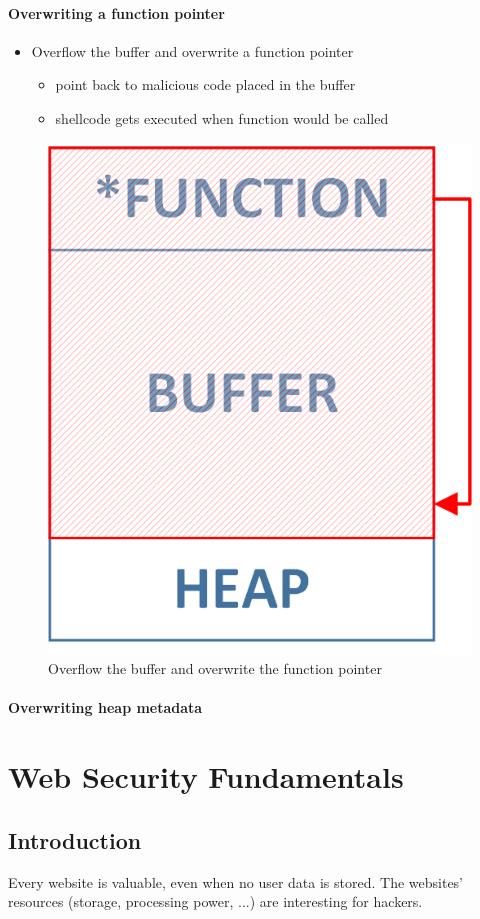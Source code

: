 \documentclass[12pt,titlepage,a4paper]{report}
\begin{document}
	\subsubsection{Overwriting a function pointer}
	\begin{itemize}
		\item Overflow the buffer and overwrite a function pointer
		\begin{itemize}
			\item point back to malicious code placed in the buffer
			\item shellcode gets executed when function would be called
		\end{itemize}
	\end{itemize}

	\begin{figure}[h]
		\centering
		\includegraphics*[scale=0.75]{assets/img/HeapBufferOverflowFunctionPointer.png}
		\caption{\label{img:heapBufferOverflowFuncionPointer}Overflow the buffer and overwrite the function pointer}
	\end{figure}
	
	\subsubsection{Overwriting heap metadata}
	
	
	\chapter{Web Security Fundamentals}
	\section{Introduction}
	Every website is valuable, even when no user data is stored. The websites' resources (storage, processing power, ...) are interesting for hackers.
\end{document}
